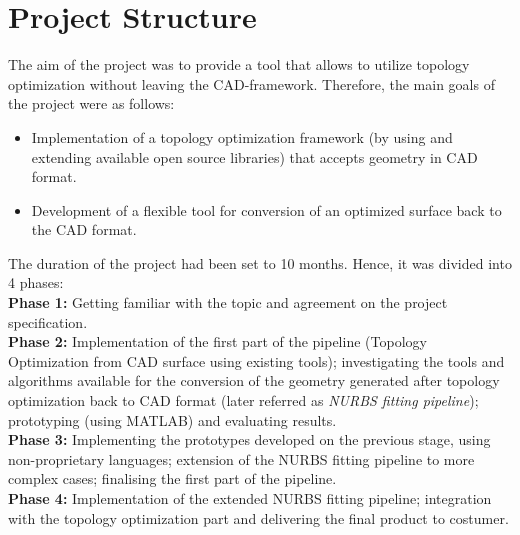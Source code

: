 \section{Project Structure}
The aim of the project was to provide a tool that allows to utilize topology optimization without leaving the CAD-framework. Therefore, the main goals of the project were as follows:
\begin{itemize}
\item Implementation of a topology optimization framework (by using and extending available open source libraries) that accepts geometry in CAD format.
\item Development of a flexible tool for conversion of an optimized surface back to the CAD format.
\end{itemize}

The duration of the project had been set to 10 months. Hence, it was divided into 4 phases:\\

\textbf{Phase 1:} Getting familiar with the topic and agreement on the project specification.\\

\textbf{Phase 2:} Implementation of the first part of the pipeline (Topology Optimization from CAD surface using existing tools); investigating the tools and algorithms available for the conversion of the geometry generated after topology optimization back to CAD format (later referred as \emph{NURBS fitting pipeline}); prototyping (using MATLAB) and evaluating results.\\

\textbf{Phase 3:} Implementing the prototypes developed on the previous stage, using non-proprietary languages; extension of the NURBS fitting pipeline to more complex cases; finalising the first part of the pipeline.\\

\textbf{Phase 4:} Implementation of the extended NURBS fitting pipeline; integration with the topology optimization part and delivering the final product to costumer.

